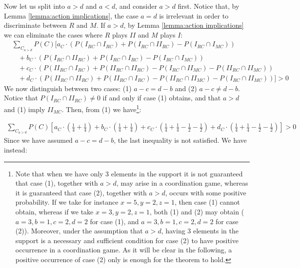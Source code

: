 \documentclass[fleqn,reqno,12pt]{article}
\theoremstyle{Satz}
\theoremstyle{Bsp}
\begin{document}
\noindent Now let us split into $a>d$ and $a<d$, and consider $a>d$ first.  Notice that, by
Lemma \ref{lemma:action implications}, the case $a=d$ is irrelevant in order to discriminate
between $R$ and $M$. If $a>d$, by Lemma \ref{lemma:action implications} we can eliminate the
cases where $R$ plays $II$ and $M$ plays $I$:
\begin{align*}
  & \textstyle{\sum_{C_{a>d}}} P(C)[a_{C} \cdot (P(I_{RC}\cap I_{RC}) + P(I_{RC}\cap II_{RC})-
  P(I_{RC}\cap I_{MC})) \\ 
  & \ \ \ \ + b_{C} \cdot (P(I_{RC}\cap II_{RC}) + P(I_{RC}\cap I_{RC})-
  P(I_{RC}\cap I_{MC})) \\ 
  & \ \ \ \ + c_{C} \cdot (P(II_{RC}\cap I_{RC}) +P(II_{RC}\cap II_{RC})-
  P(I_{RC}\cap II_{MC})- P(II_{RC}\cap II_{MC})) \\ 
  & \ \ \ \ + d_{C} \cdot (P(II_{RC}\cap
  II_{RC})+P(II_{RC}\cap I_{RC})- P(II_{RC}\cap II_{MC})- P(I_{RC}\cap II_{MC}))]> 0
\end{align*}
\noindent We now distinguish between two cases: (1) $ a-c = d-b $ and (2) $  a-c \neq d-b $. Notice that $P(I_{RC}\cap II_{RC}) \neq 0$ if and only if case (1) obtains, and that $a>d$ and (1) imply $II_{MC}$. Then, from (1) we have\footnote{Note that when we have only 3 elements in the support it is not guaranteed that case (1), together with $a>d$, may arise in a coordination game, whereas it is guaranteed that case (2), together with $a>d$, occurs with some positive probability. If we take for instance $x= 5, y= 2, z= 1$, then case (1) cannot obtain, whereas if we take $x= 3, y= 2, z= 1$, both (1) and (2) may obtain ($a=3, b=1, c=2, d=2$ for case (1), and $a=3, b=1, c=2, d=2$ for case (2)). Moreover, under the assumption that $a>d$, having 3 elements in the support is a necessary and sufficient condition for case (2) to have positive occurrence in a coordination game. As it will be clear in the following, a positive occurrence of case (2) only is enough for the theorem to hold.}:

\begin{align*}
\textstyle{\sum_{C_{a>d}}} P(C)[a_{C} \cdot (\frac{1}{4}+\frac{1}{4}) + b_{C} \cdot  (\frac{1}{4}+\frac{1}{4}) + c_{C} \cdot (\frac{1}{4}+\frac{1}{4}-\frac{1}{2}-\frac{1}{2}) + d_{C} \cdot (\frac{1}{4}+\frac{1}{4}-\frac{1}{2}-\frac{1}{2})]> 0
\end{align*}
\noindent Since we have assumed $ a-c = d-b $, the last inequality is not satisfied. We have instead:
\end{document}
